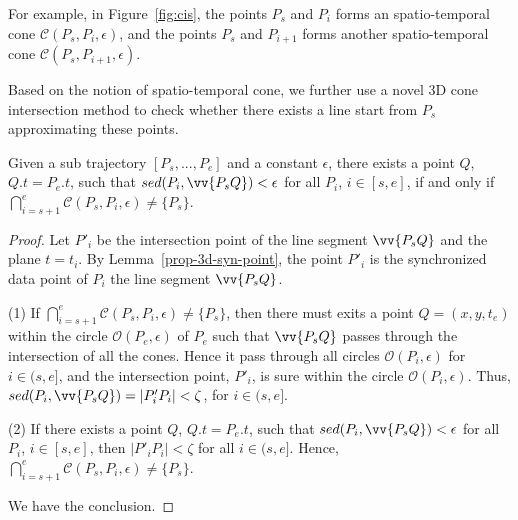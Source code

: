 For example, in Figure~\ref{fig:cis}, the points $P_s$ and $P_i$ forms an spatio-temporal cone $\mathcal{C}(P_s, P_i, \epsilon)$, and the points $P_s$ and $P_{i+1}$ forms another spatio-temporal cone $\mathcal{C}(P_s, P_{i+1}, \epsilon)$.

Based on the notion of spatio-temporal cone, we further use a novel 3D cone intersection method to check whether there exists a line start from $P_s$ approximating these points.

\begin{theorem}
\label{prop-3d-ci}
Given a sub trajectory $[P_s,...,P_e]$ and a constant $\epsilon$, there exists a point $Q$, $Q.t = P_e.t$, such that $sed(P_i, \vv{P_sQ})<\epsilon$ for all $P_i$, $i \in [s,e]$, if and only if $\bigcap_{i=s+1}^{e}{\mathcal{C}(P_s, P_i, \epsilon)} \ne \{P_s\}$.
\end{theorem}

\begin{proof}
Let $P'_i$ be the intersection point of the line segment $\vv{P_sQ}$ and the plane $t=t_i$.
By Lemma~\ref{prop-3d-syn-point}, the point $P'_i$ is the synchronized data point of $P_i$ \wrt the line segment $\vv{P_sQ}$.


(1) If $\bigcap_{i=s+1}^{e}{\mathcal{C}(P_s, P_i, \epsilon)} \ne \{P_s\}$, then there must exits a point $Q = (x,y,t_e)$ within the circle $\mathcal{O}(P_e, \epsilon)$ of $P_e$ such that $\vv{P_sQ}$ passes through the intersection of all the cones. Hence it pass through all circles $\mathcal{O}(P_i, \epsilon)$ for $i \in (s, e]$, and the intersection point, $P'_i$, is sure within the circle $\mathcal{O}(P_i, \epsilon)$. Thus, $sed(P_i, \vv{P_sQ}) = |P'_iP_i| < \zeta$, for $i \in (s, e]$.

(2) If there exists a point $Q$, $Q.t = P_e.t$, such that $sed(P_i, \vv{P_sQ})<\epsilon$ for all $P_i$, $i \in [s,e]$, then $|P'_iP_i| < \zeta$ for all $i \in (s, e]$. Hence, $\bigcap_{i=s+1}^{e}{\mathcal{C}(P_s, P_i, \epsilon)} \ne \{P_s\}$.

We have the conclusion.
\end{proof}


